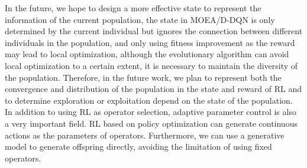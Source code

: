 \documentclass[journal]{IEEEtran}
\begin{document}
In the future, we hope to design a more effective state to represent the information of the current population, the state in MOEA/D-DQN is only determined by the current individual but ignores the connection between different individuals in the population, and only using fitness improvement as the reward may lead to local optimization, although the evolutionary algorithm can avoid local optimization to a certain extent, it is necessary to maintain the diversity of the population. Therefore, in the future work, we plan to represent both the convergence and distribution of the population in the state and reward of RL and to determine exploration or exploitation depend on the state of the population.
In addition to using RL as operator selection, adaptive parameter control is also a very important field. RL based on policy optimization can generate continuous actions as the parameters of operators. Furthermore, we can use a generative model to generate offspring directly, avoiding the limitation of using fixed operators.


\ifCLASSOPTIONcaptionsoff
  \newpage
\fi



\end{document}

